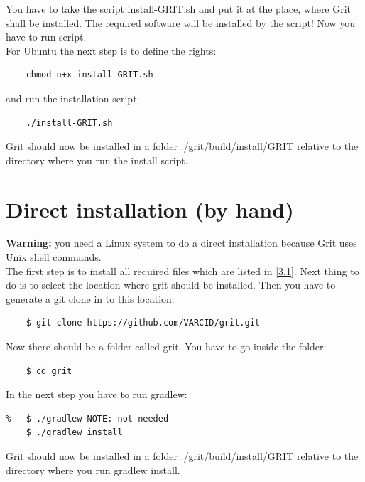 \documentclass[10pt,a4paper, titlepage, toc=idx]{scrreprt}
\theoremstyle{definition}
\theoremstyle{plain}
\newcommand*{\product}{Grit}
\begin{document}
\noindent You have to take the script install-GRIT.sh and put it at the place, where \product{} shall be installed. The required software will be installed by the script! Now you have to run script.\\

\noindent For Ubuntu  the next step is to define the rights:
\begin{lstlisting}
	chmod u+x install-GRIT.sh
\end{lstlisting}
and run the installation script:
\begin{lstlisting}
	./install-GRIT.sh
\end{lstlisting}
\product{} should now be installed in a folder ./grit/build/install/GRIT
relative to the directory where you run the install script.

\section{Direct installation (by hand)}
\textbf{Warning:} you need a Linux system to do a direct installation because Grit uses Unix shell commands.\\

\noindent The first step is to install all required files which are listed in \ref{3.1}. Next thing to do is to select the location where grit should be installed. Then you have to generate a git clone in to this location: 
\begin{lstlisting}
	$ git clone https://github.com/VARCID/grit.git
\end{lstlisting}

\noindent Now there should be a folder called grit. You have to go inside the folder:
\begin{lstlisting}
	$ cd grit
\end{lstlisting}

\noindent In the next step you have to run gradlew: 
\begin{lstlisting}
%	$ ./gradlew	NOTE: not needed			
	$ ./gradlew install
\end{lstlisting}
\product{} should now be installed in a folder ./grit/build/install/GRIT
relative to the directory where you run gradlew install.


%
\end{document}

